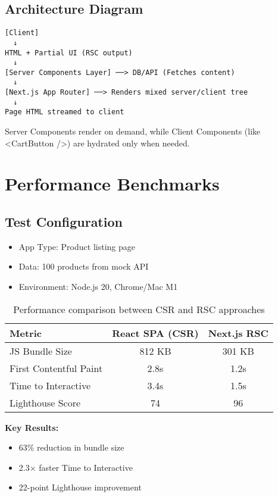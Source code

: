 \documentclass[12pt]{article}
\begin{document}
\subsection*{Architecture Diagram}
\begin{verbatim}
[Client]
  ↓
HTML + Partial UI (RSC output)
  ↓
[Server Components Layer] ──> DB/API (Fetches content)
  ↓
[Next.js App Router] ──> Renders mixed server/client tree
  ↓
Page HTML streamed to client
\end{verbatim}

Server Components render on demand, while Client Components (like <CartButton />) are hydrated only when needed.

\section{Performance Benchmarks}
\subsection*{Test Configuration}
\begin{itemize}
    \item App Type: Product listing page
    \item Data: 100 products from mock API
    \item Environment: Node.js 20, Chrome/Mac M1
\end{itemize}

\begin{table}[h]
\centering
\begin{tabular}{lcc}
\toprule
\textbf{Metric} & \textbf{React SPA (CSR)} & \textbf{Next.js RSC} \\
\midrule
JS Bundle Size & 812 KB & 301 KB \\
First Contentful Paint & 2.8s & 1.2s \\
Time to Interactive & 3.4s & 1.5s \\
Lighthouse Score & 74 & 96 \\
\bottomrule
\end{tabular}
\caption{Performance comparison between CSR and RSC approaches}
\end{table}

\textbf{Key Results:}
\begin{itemize}
    \item 63\% reduction in bundle size
    \item 2.3× faster Time to Interactive
    \item 22-point Lighthouse improvement
\end{itemize}
\end{document}
